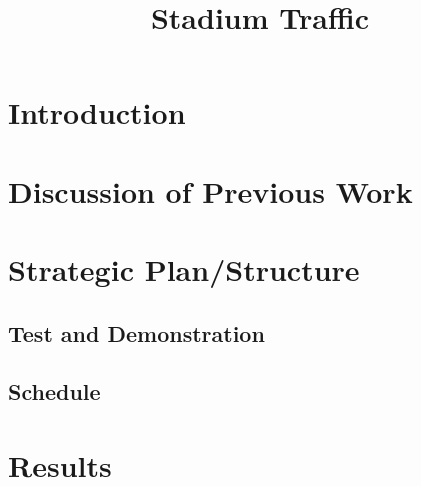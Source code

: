 \documentclass[12pt]{article}
\title{Stadium Traffic}
\begin{document}
\maketitle
\abstract



\newpage

\tableofcontents

\newpage

\mainmatter

\section{Introduction}



\section{Discussion of Previous Work}




\section{Strategic Plan/Structure}



\subsection{Test and Demonstration}



\subsection{Schedule}



\section{Results}
\end{document}
